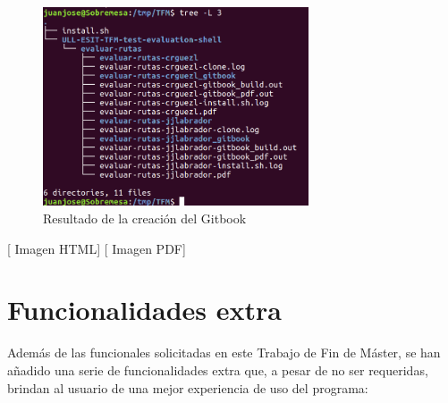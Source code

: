 		\begin{figure}[H]
		\begin{center}
		\includegraphics[width=0.7\textwidth]{images/ghshell8-2}
		\caption{Resultado de la creación del Gitbook}
		\label{fig:ghshell8-2}
		\end{center}
		\end{figure}
		
        		        		[ Imagen HTML]
        		        		        		[ Imagen PDF]
\newpage
\section{Funcionalidades extra}
\label{3:sec:2}

Además de las funcionales solicitadas en este Trabajo de Fin de Máster, se han añadido una serie de funcionalidades extra que, a pesar de no ser requeridas, brindan al usuario de una mejor experiencia de uso del programa:

